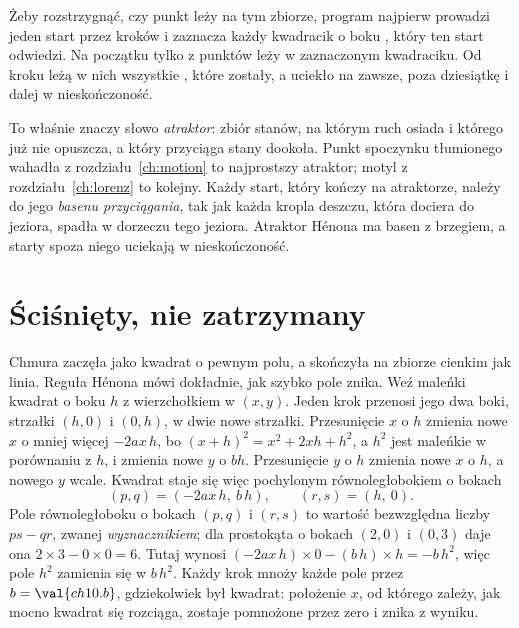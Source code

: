 

\noindent
Żeby rozstrzygnąć, czy punkt leży na tym zbiorze, program najpierw prowadzi
jeden start przez  kroków i zaznacza każdy kwadracik o
boku , który ten start odwiedzi. Na początku tylko
 z  punktów leży w zaznaczonym
kwadraciku. Od kroku  leżą w nich wszystkie
, które zostały, a  uciekło na
zawsze, poza dziesiątkę i dalej w nieskończoność.

To właśnie znaczy słowo \emph{atraktor}: zbiór stanów, na którym ruch osiada i
którego już nie opuszcza, a który przyciąga stany dookoła. Punkt spoczynku
tłumionego wahadła z rozdziału~\ref{ch:motion} to najprostszy atraktor; motyl
z rozdziału~\ref{ch:lorenz} to kolejny. Każdy start, który kończy na
atraktorze, należy do jego \emph{basenu przyciągania}, tak jak każda kropla
deszczu, która dociera do jeziora, spadła w dorzeczu tego jeziora. Atraktor
Hénona ma basen z brzegiem, a starty spoza niego uciekają w nieskończoność.


\section{Ściśnięty, nie zatrzymany}
\label{sec:ch10-area}

\noindent
Chmura zaczęła jako kwadrat o pewnym polu, a skończyła na zbiorze cienkim jak
linia. Reguła Hénona mówi dokładnie, jak szybko pole znika. Weź maleńki
kwadrat o boku $h$ z wierzchołkiem w $(x, y)$. Jeden krok przenosi jego dwa
boki, strzałki $(h, 0)$ i $(0, h)$, w dwie nowe strzałki. Przesunięcie $x$ o
$h$ zmienia nowe $x$ o mniej więcej $-2ax\,h$, bo
$(x + h)^{2} = x^{2} + 2xh + h^{2}$, a $h^{2}$ jest maleńkie w porównaniu z
$h$, i zmienia nowe $y$ o $bh$. Przesunięcie $y$ o $h$ zmienia nowe $x$ o $h$,
a nowego $y$ wcale. Kwadrat staje się więc pochylonym równoległobokiem o
bokach
\[ (p, q) = (-2ax\,h,\ b\,h), \qquad (r, s) = (h,\ 0). \]
Pole równoległoboku o bokach $(p, q)$ i $(r, s)$ to wartość bezwzględna liczby
$ps - qr$, zwanej \emph{wyznacznikiem}; dla prostokąta o bokach $(2, 0)$ i
$(0, 3)$ daje ona $2 \times 3 - 0 \times 0 = 6$. Tutaj wynosi
$(-2ax\,h) \times 0 - (b\,h) \times h = -b\,h^{2}$, więc pole $h^{2}$
zamienia się w $b\,h^{2}$. Każdy krok mnoży każde pole przez
$b = \val{ch10.b}$, gdziekolwiek był kwadrat: położenie $x$, od którego
zależy, jak mocno kwadrat się rozciąga, zostaje pomnożone przez zero i znika
z wyniku.

